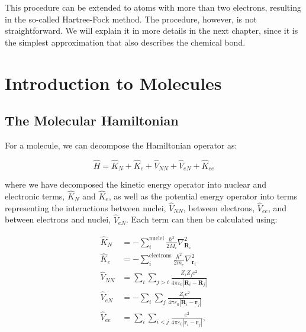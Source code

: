 \documentclass[
  9pt,
]{extbook}
\theoremstyle{definition}
\theoremstyle{definition}
\theoremstyle{definition}
\theoremstyle{remark}
\begin{document}
This procedure can be extended to atoms with more than two electrons, resulting in the so-called Hartree-Fock method. The procedure, however, is not straightforward. We will explain it in more details in the next chapter, since it is the simplest approximation that also describes the chemical bond.

\hypertarget{Molecules}{%
\chapter{Introduction to Molecules}\label{Molecules}}

\hypertarget{the-molecular-hamiltonian}{%
\section{The Molecular Hamiltonian}\label{the-molecular-hamiltonian}}

For a molecule, we can decompose the Hamiltonian operator as:

\begin{equation}
\hat{H} = \hat{K}_N +\hat{K}_{e} + \hat{V}_{NN} + \hat{V}_{eN} + \hat{K}_{ee}
\label{eq:molham1}
\end{equation}

where we have decomposed the kinetic energy operator into nuclear and electronic terms, \(\hat{K}_N\) and \(\hat{K}_e\), as well as the potential energy operator into terms representing the interactions between nuclei, \(\hat{V}_{NN}\), between electrons, \(\hat{V}_{ee}\), and between electrons and nuclei, \(\hat{V}_{eN}\). Each term can then be calculated using:

\begin{equation}
\begin{aligned}
\hat{K}_{N} &=-\sum_{i}^{\text{nuclei}}{\frac  {\hbar ^{2}}{2M_{i}}}\nabla_{{{\mathbf  {R}}_{i}}}^{2} \\
\hat  {K}_{e} &=-\sum_{i}^{\text{electrons}}{\frac  {\hbar ^{2}}{2m_{e}}}\nabla _{{{\mathbf{r}}_{i}}}^{2} \\
\hat{V}_{{NN}} &= \sum _{i}\sum _{{j>i}}{\frac  {Z_{i}Z_{j}e^{2}}{4\pi \varepsilon _{0}\left|{\mathbf  {R}}_{i}-{\mathbf  {R}}_{j}\right|}} \\
\hat  {V}_{{eN}} &=-\sum _{i}\sum _{j}{\frac  {Z_{i}e^{2}}{4\pi \varepsilon_{0}\left|{\mathbf  {R}}_{i}-{\mathbf  {r}}_{j}\right|}} \\
\hat{V}_{{ee}} &= \sum _{i}\sum _{{i<j}}{\frac  {e^{2}}{4\pi \varepsilon _{0}\left|{\mathbf  {r}}_{i}-{\mathbf  {r}}_{j}\right|}},
\end{aligned}
\label{eq:molham2}
\end{equation}
\end{document}
